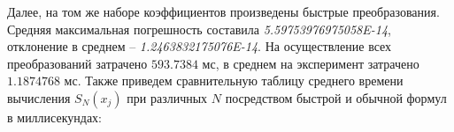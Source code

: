 Далее, на том же наборе коэффициентов произведены быстрые преобразования.
Средняя максимальная погрешность составила \textit{5.59753976975058E-14}, отклонение в среднем -- \linebreak \textit{1.2463832175076E-14}.
На осуществление всех преобразований затрачено $593.7384$ мс, в среднем на эксперимент затрачено $1.1874768$ мс. Также приведем сравнительную таблицу среднего времени вычисления $S_N(x_j)$ при различных $N$ посредством быстрой и обычной формул в миллисекундах:

